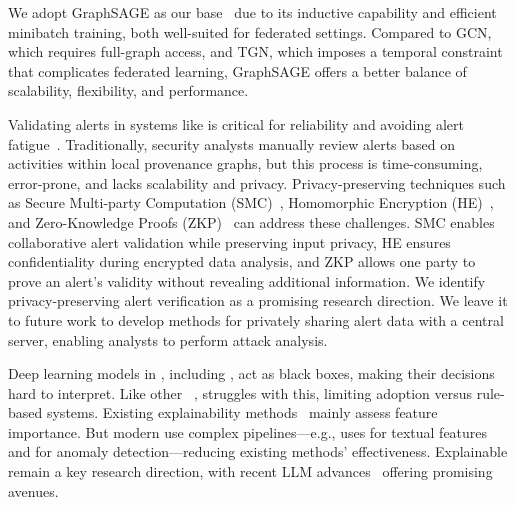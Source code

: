  We adopt GraphSAGE as our base \gnnshort\ due to its inductive capability and efficient minibatch training, both well-suited for federated settings. Compared to GCN, which requires full-graph access, and TGN, which imposes a temporal constraint that complicates federated learning, GraphSAGE offers a better balance of scalability, flexibility, and performance.


 Validating alerts in systems like \Sys is critical for reliability and avoiding alert fatigue~\cite{nodoze2019}. Traditionally, security analysts manually review alerts based on activities within local provenance graphs, but this process is time-consuming, error-prone, and lacks scalability and privacy. Privacy-preserving techniques such as Secure Multi-party Computation (SMC)~\cite{goldreich1998secure}, Homomorphic Encryption (HE)~\cite{yi2014homomorphic}, and Zero-Knowledge Proofs (ZKP)~\cite{fiege1987zero} can address these challenges. SMC enables collaborative alert validation while preserving input privacy, HE ensures confidentiality during encrypted data analysis, and ZKP allows one party to prove an alert's validity without revealing additional information. We identify privacy-preserving alert verification as a promising research direction. We leave it to future work to develop methods for privately sharing alert data with a central server, enabling analysts to perform attack analysis.

 Deep learning models in \pids, including \Sys, act as black boxes, making their decisions hard to interpret. Like other \pids~\cite{flash2024,cheng2023kairos,yangprographer}, \Sys struggles with this, limiting adoption versus rule-based systems. Existing explainability methods~\cite{antwarg2021explaining,brown2018recurrent,ardito2021revisiting,hwang2021sfd} mainly assess feature importance. But modern \pids use complex pipelines—e.g., \flash uses \wordvec for textual features and \gnnshort for anomaly detection—reducing existing methods' effectiveness. Explainable \pids remain a key research direction, with recent LLM advances~\cite{chang2024survey} offering promising avenues.




